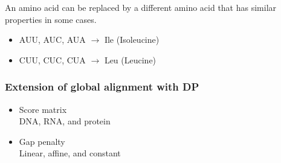 \noindent
An amino acid can be replaced by a different amino acid that has similar properties in some cases.
\begin{itemize}
\item AUU, AUC, AUA $\rightarrow$ Ile (Isoleucine)
\item CUU, CUC, CUA $\rightarrow$ Leu (Leucine)
\end{itemize}

%
%
\subsubsection*{Extension of global alignment with DP}

\begin{itemize}
\item Score matrix \\
DNA, RNA, and protein

\item Gap penalty \\
Linear, affine, and constant
\end{itemize}

\bigskip 

%
